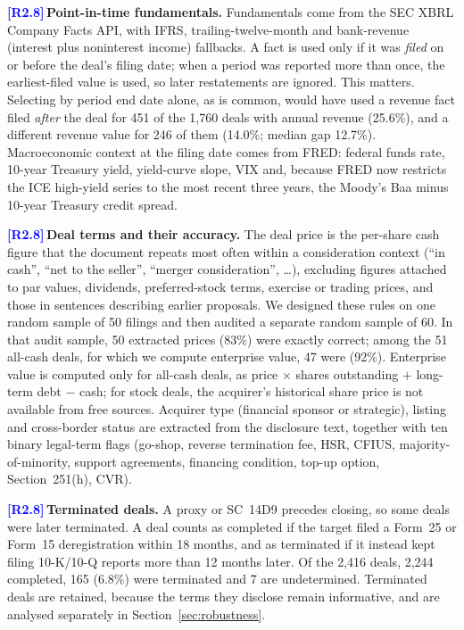 \documentclass[conference]{IEEEtran}
\newcommand{\rc}[1]{\textcolor{blue}{\textbf{[#1]}}\,}
\newcommand{\rc}[1]{}
\begin{document}
\rc{R2.8}\noindent\textbf{Point-in-time fundamentals.}
Fundamentals come from the SEC XBRL Company Facts API, with IFRS, trailing-twelve-month and bank-revenue (interest plus noninterest income) fallbacks. A fact is used only if it was \emph{filed} on or before the deal's filing date; when a period was reported more than once, the earliest-filed value is used, so later restatements are ignored. This matters. Selecting by period end date alone, as is common, would have used a revenue fact filed \emph{after} the deal for 451 of the 1{,}760 deals with annual revenue (25.6\%), and a different revenue value for 246 of them (14.0\%; median gap 12.7\%). Macroeconomic context at the filing date comes from FRED: federal funds rate, 10-year Treasury yield, yield-curve slope, VIX and, because FRED now restricts the ICE high-yield series to the most recent three years, the Moody's Baa minus 10-year Treasury credit spread.

\rc{R2.8}\noindent\textbf{Deal terms and their accuracy.}
The deal price is the per-share cash figure that the document repeats most often within a consideration context (``in cash'', ``net to the seller'', ``merger consideration'', \dots), excluding figures attached to par values, dividends, preferred-stock terms, exercise or trading prices, and those in sentences describing earlier proposals. We designed these rules on one random sample of 50 filings and then audited a separate random sample of 60. In that audit sample, 50 extracted prices (83\%) were exactly correct; among the 51 all-cash deals, for which we compute enterprise value, 47 were (92\%). Enterprise value is computed only for all-cash deals, as price $\times$ shares outstanding $+$ long-term debt $-$ cash; for stock deals, the acquirer's historical share price is not available from free sources. Acquirer type (financial sponsor or strategic), listing and cross-border status are extracted from the disclosure text, together with ten binary legal-term flags (go-shop, reverse termination fee, HSR, CFIUS, majority-of-minority, support agreements, financing condition, top-up option, Section~251(h), CVR).

\rc{R2.8}\noindent\textbf{Terminated deals.}
A proxy or SC~14D9 precedes closing, so some deals were later terminated. A deal counts as completed if the target filed a Form~25 or Form~15 deregistration within 18 months, and as terminated if it instead kept filing 10-K/10-Q reports more than 12 months later. Of the 2{,}416 deals, 2{,}244 completed, 165 (6.8\%) were terminated and 7 are undetermined. Terminated deals are retained, because the terms they disclose remain informative, and are analysed separately in Section~\ref{sec:robustness}.
\end{document}
